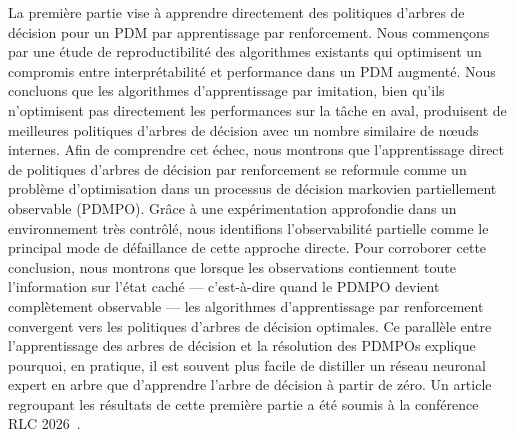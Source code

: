 \documentclass{article}
\begin{document}
La première partie vise à apprendre directement des politiques d'arbres de décision pour un PDM par apprentissage par renforcement.
Nous commençons par une étude de reproductibilité des algorithmes existants qui optimisent un compromis entre interprétabilité et performance dans un PDM augmenté.
Nous concluons que les algorithmes d'apprentissage par imitation, bien qu'ils n'optimisent pas directement les performances sur la tâche en aval, produisent de meilleures politiques d'arbres de décision avec un nombre similaire de nœuds internes.
Afin de comprendre cet échec, nous montrons que l'apprentissage direct de politiques d'arbres de décision par renforcement se reformule comme un problème d'optimisation dans un processus de décision markovien partiellement observable (PDMPO).
Grâce à une expérimentation approfondie dans un environnement très contrôlé, nous identifions l'observabilité partielle comme le principal mode de défaillance de cette approche directe.
Pour corroborer cette conclusion, nous montrons que lorsque les observations contiennent toute l'information sur l'état caché --- c'est-à-dire quand le PDMPO devient complètement observable --- les algorithmes d'apprentissage par renforcement convergent vers les politiques d'arbres de décision optimales.
Ce parallèle entre l'apprentissage des arbres de décision et la résolution des PDMPOs explique pourquoi, en pratique, il est souvent plus facile de distiller un réseau neuronal expert en arbre que d'apprendre l'arbre de décision à partir de zéro.
Un article regroupant les résultats de cette première partie a été soumis à la conférence RLC 2026~\cite{pomdp}.
\end{document}
